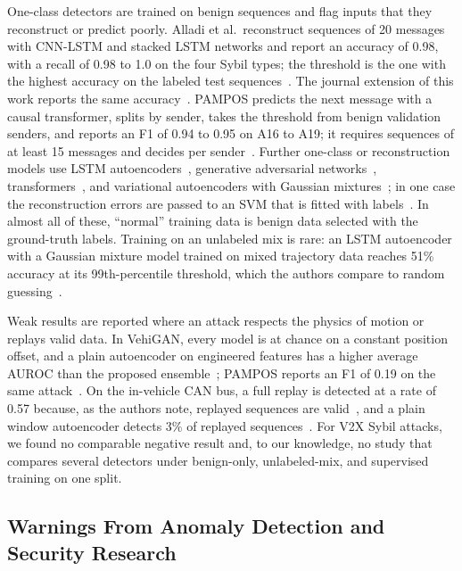 One-class detectors are trained on benign sequences and flag inputs that they reconstruct or predict poorly.
Alladi et al.\ reconstruct sequences of 20 messages with CNN-LSTM and stacked LSTM networks and report an accuracy
of 0.98, with a recall of 0.98 to 1.0 on the four Sybil types; the threshold is the one with the highest accuracy
on the labeled test sequences~\cite{alladi2021deep}. The journal extension of this work reports the same
accuracy~\cite{alladi2021deepadv}. PAMPOS predicts the next message with a
causal transformer, splits by sender, takes the threshold from benign validation senders, and reports an F1 of 0.94
to 0.95 on A16 to A19; it requires sequences of at least 15 messages and decides per
sender~\cite{kalogiannis2026pampos}. Further one-class or reconstruction models
use LSTM autoencoders~\cite{vishwanath2026federated}, generative adversarial
networks~\cite{zhong2023sybil,shahriar2024vehigan}, transformers~\cite{liu2023svmdformer}, and variational
autoencoders with Gaussian mixtures~\cite{campos2025federated}; in one case the reconstruction errors are passed
to an SVM that is fitted with labels~\cite{bao2026lstm}. In almost all of these, ``normal'' training data is
benign data selected with the ground-truth labels. Training on an unlabeled mix is rare: an LSTM autoencoder with a
Gaussian mixture model trained on mixed trajectory data reaches 51\% accuracy at its 99th-percentile threshold,
which the authors compare to random guessing~\cite{wang2024anomaly}.

Weak results are reported where an attack respects the physics of motion or replays valid data. In VehiGAN, every
model is at chance on a constant position offset, and a plain autoencoder on engineered features has a higher
average AUROC than the proposed ensemble~\cite{shahriar2024vehigan}; PAMPOS reports an F1 of 0.19 on the same
attack~\cite{kalogiannis2026pampos}. On the in-vehicle CAN bus, a full replay is detected at a rate of 0.57
because, as the authors note, replayed sequences are valid~\cite{longari2022candito}, and a plain window
autoencoder detects 3\% of replayed sequences~\cite{hanselmann2020canet}. For V2X Sybil attacks, we found no
comparable negative result and, to our knowledge, no study that compares several detectors under benign-only,
unlabeled-mix, and supervised training on one split.

\subsection{Warnings From Anomaly Detection and Security Research}

